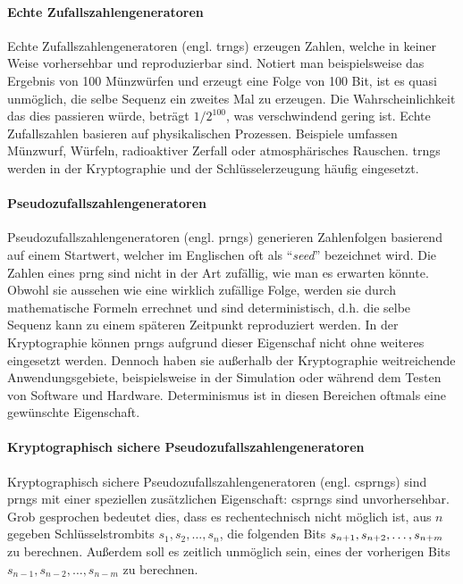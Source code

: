 \paragraph{Echte Zufallszahlengeneratoren}
Echte Zufallszahlengeneratoren (engl. \acp{trng})
erzeugen Zahlen, welche in keiner Weise vorhersehbar und reproduzierbar sind. Notiert man
beispielsweise das Ergebnis von 100 Münzwürfen und erzeugt eine Folge von 100 Bit, ist es quasi
unmöglich, die selbe Sequenz ein zweites Mal zu erzeugen. Die Wahrscheinlichkeit
das dies passieren würde, beträgt $1/2^{100}$, was verschwindend gering ist.
Echte Zufallszahlen basieren auf physikalischen Prozessen. Beispiele umfassen Münzwurf, Würfeln,
radioaktiver Zerfall oder atmosphärisches Rauschen. \acp{trng} werden in der Kryptographie und
der Schlüsselerzeugung häufig eingesetzt.

\paragraph{Pseudozufallszahlengeneratoren}
Pseudozufallszahlengeneratoren (engl. \acp{prng})
generieren Zahlenfolgen basierend auf einem Startwert, welcher im Englischen oft als
\enquote{\textit{seed}} bezeichnet wird. Die Zahlen eines \ac{prng} sind nicht in der Art zufällig,
wie man es erwarten könnte.
Obwohl sie aussehen wie eine wirklich zufällige Folge, werden sie durch
mathematische Formeln errechnet und sind deterministisch, d.h. die selbe Sequenz
kann zu einem späteren Zeitpunkt reproduziert werden.
In der Kryptographie können \acp{prng} aufgrund dieser Eigenschaf
nicht ohne weiteres eingesetzt werden.
Dennoch haben sie außerhalb der Kryptographie weitreichende Anwendungsgebiete,
beispielsweise in der Simulation oder während dem Testen von Software und Hardware.
Determinismus ist in diesen Bereichen oftmals eine gewünschte Eigenschaft.

\paragraph{Kryptographisch sichere Pseudozufallszahlengeneratoren}
Kryptographisch sichere Pseudozufallszahlengeneratoren
(engl. \acp{csprng}) sind \acp{prng} mit
einer speziellen zusätzlichen Eigenschaft: \acp{csprng} sind unvorhersehbar. Grob gesprochen
bedeutet dies, dass es rechentechnisch nicht möglich ist, aus $n$ gegeben Schlüsselstrombits
$s_1,s_2,\dots,s_n$, die folgenden Bits $s_{n+1},\\s_{n+2},\dots,s_{n+m}$ zu berechnen. Außerdem
soll es zeitlich unmöglich sein, eines der vorherigen Bits $s_{n-1},s_{n-2},\dots,s_{n-m}$ zu
berechnen.

